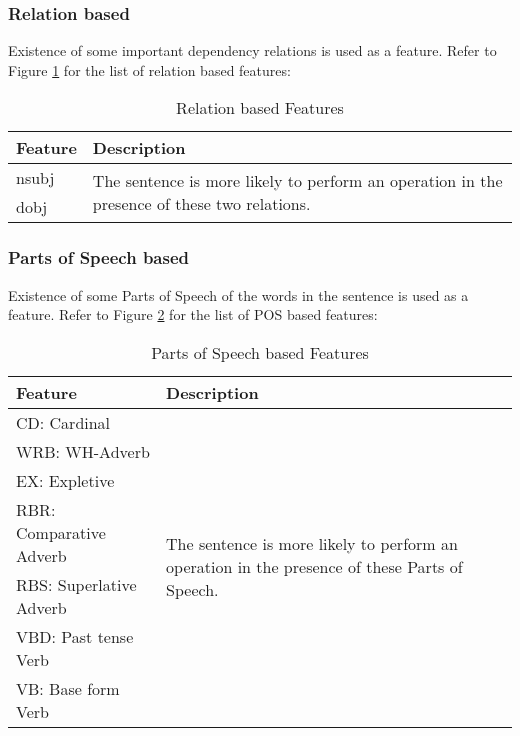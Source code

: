 \documentclass[11pt]{article}
\begin{document}
\subsubsection{Relation based}
Existence of some important dependency relations is used as a feature. Refer to Figure \ref{figure:9} for the list of relation based features:
\begin{table}[H]
\begin{tabular}{|m{2cm} | m{4cm}|}
\hline 
\textbf{\small Feature} & \textbf{\small Description}\\ \hline
\small nsubj & \multirow{2}{4cm}{\small The sentence is more likely to perform an operation in the presence of these two relations.} \\[10pt]
\cline{1-1} 
 \small dobj & \\[10pt]
\hline
\end{tabular}
\caption{Relation based Features}
\label{figure:9}
\end{table}
\vspace{0.15cm}
\subsubsection{Parts of Speech based}
Existence of some Parts of Speech of the words in the sentence is used as a feature. Refer to Figure \ref{figure:10} for the list of POS based features:

\begin{table}[H]
\centering
\begin{tabular}{ | m{3cm} | m{4cm} |}
\hline
\textbf{\small Feature} & \textbf{\small Description}\\ \hline
\small CD: Cardinal & \multirow{8}{4cm}{\centering The sentence is more likely to perform an operation in the presence of these Parts of Speech.} \\
\cline{1-1} 
\small WRB: WH-Adverb & \\
\cline{1-1} 
\small EX: Expletive & \\ 
\cline{1-1} 
\small RBR: Comparative Adverb & \\ 
\cline{1-1} 
\small RBS: Superlative Adverb & \\ 
\cline{1-1} 
\small VBD: Past tense Verb & \\ 
\cline{1-1} 
\small VB: Base form Verb & \\ 
\hline
\end{tabular}
\caption{Parts of Speech based Features}
\label{figure:10}
\end{table}
\vspace{0.15cm}
\end{document}
